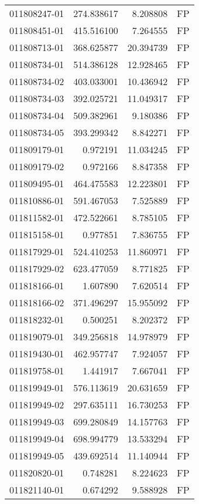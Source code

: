 \begin{tabular}{lrrl}
011808247-01 &  274.838617 &     8.208808 &   FP \\
011808451-01 &  415.516100 &     7.264555 &   FP \\
011808713-01 &  368.625877 &    20.394739 &   FP \\
011808734-01 &  514.386128 &    12.928465 &   FP \\
011808734-02 &  403.033001 &    10.436942 &   FP \\
011808734-03 &  392.025721 &    11.049317 &   FP \\
011808734-04 &  509.382961 &     9.180386 &   FP \\
011808734-05 &  393.299342 &     8.842271 &   FP \\
011809179-01 &    0.972191 &    11.034245 &   FP \\
011809179-02 &    0.972166 &     8.847358 &   FP \\
011809495-01 &  464.475583 &    12.223801 &   FP \\
011810886-01 &  591.467053 &     7.525889 &   FP \\
011811582-01 &  472.522661 &     8.785105 &   FP \\
011815158-01 &    0.977851 &     7.836755 &   FP \\
011817929-01 &  524.410253 &    11.860971 &   FP \\
011817929-02 &  623.477059 &     8.771825 &   FP \\
011818166-01 &    1.607890 &     7.620514 &   FP \\
011818166-02 &  371.496297 &    15.955092 &   FP \\
011818232-01 &    0.500251 &     8.202372 &   FP \\
011819079-01 &  349.256818 &    14.978979 &   FP \\
011819430-01 &  462.957747 &     7.924057 &   FP \\
011819758-01 &    1.441917 &     7.667041 &   FP \\
011819949-01 &  576.113619 &    20.631659 &   FP \\
011819949-02 &  297.635111 &    16.730253 &   FP \\
011819949-03 &  699.280849 &    14.157763 &   FP \\
011819949-04 &  698.994779 &    13.533294 &   FP \\
011819949-05 &  439.692514 &    11.140944 &   FP \\
011820820-01 &    0.748281 &     8.224623 &   FP \\
011821140-01 &    0.674292 &     9.588928 &   FP \\

\end{tabular}
